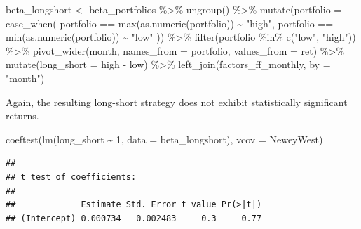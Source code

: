 \documentclass[
]{krantz}
\newenvironment{Shaded}{\begin{snugshade}}{\end{snugshade}}
\newcommand{\AttributeTok}[1]{\textcolor[rgb]{0.61,0.61,0.61}{#1}}
\newcommand{\DecValTok}[1]{\textcolor[rgb]{0.06,0.06,0.06}{#1}}
\newcommand{\FunctionTok}[1]{\textcolor[rgb]{0,0,0}{#1}}
\newcommand{\NormalTok}[1]{#1}
\newcommand{\OtherTok}[1]{\textcolor[rgb]{0.37,0.37,0.37}{#1}}
\newcommand{\SpecialCharTok}[1]{\textcolor[rgb]{0,0,0}{#1}}
\newcommand{\StringTok}[1]{\textcolor[rgb]{0.5,0.5,0.5}{#1}}
\begin{document}
\begin{Shaded}
\begin{Highlighting}[]
\NormalTok{beta\_longshort }\OtherTok{\textless{}{-}}\NormalTok{ beta\_portfolios }\SpecialCharTok{\%\textgreater{}\%}
  \FunctionTok{ungroup}\NormalTok{() }\SpecialCharTok{\%\textgreater{}\%}
  \FunctionTok{mutate}\NormalTok{(}\AttributeTok{portfolio =} \FunctionTok{case\_when}\NormalTok{(}
\NormalTok{    portfolio }\SpecialCharTok{==} \FunctionTok{max}\NormalTok{(}\FunctionTok{as.numeric}\NormalTok{(portfolio)) }\SpecialCharTok{\textasciitilde{}} \StringTok{"high"}\NormalTok{,}
\NormalTok{    portfolio }\SpecialCharTok{==} \FunctionTok{min}\NormalTok{(}\FunctionTok{as.numeric}\NormalTok{(portfolio)) }\SpecialCharTok{\textasciitilde{}} \StringTok{"low"}
\NormalTok{  )) }\SpecialCharTok{\%\textgreater{}\%}
  \FunctionTok{filter}\NormalTok{(portfolio }\SpecialCharTok{\%in\%} \FunctionTok{c}\NormalTok{(}\StringTok{"low"}\NormalTok{, }\StringTok{"high"}\NormalTok{)) }\SpecialCharTok{\%\textgreater{}\%}
  \FunctionTok{pivot\_wider}\NormalTok{(month, }\AttributeTok{names\_from =}\NormalTok{ portfolio, }\AttributeTok{values\_from =}\NormalTok{ ret) }\SpecialCharTok{\%\textgreater{}\%}
  \FunctionTok{mutate}\NormalTok{(}\AttributeTok{long\_short =}\NormalTok{ high }\SpecialCharTok{{-}}\NormalTok{ low) }\SpecialCharTok{\%\textgreater{}\%}
  \FunctionTok{left\_join}\NormalTok{(factors\_ff\_monthly, }\AttributeTok{by =} \StringTok{"month"}\NormalTok{)}
\end{Highlighting}
\end{Shaded}

Again, the resulting long-short strategy does not exhibit statistically significant returns.

\begin{Shaded}
\begin{Highlighting}[]
\FunctionTok{coeftest}\NormalTok{(}\FunctionTok{lm}\NormalTok{(long\_short }\SpecialCharTok{\textasciitilde{}} \DecValTok{1}\NormalTok{, }\AttributeTok{data =}\NormalTok{ beta\_longshort), }\AttributeTok{vcov =}\NormalTok{ NeweyWest)}
\end{Highlighting}
\end{Shaded}

\begin{verbatim}
## 
## t test of coefficients:
## 
##             Estimate Std. Error t value Pr(>|t|)
## (Intercept) 0.000734   0.002483     0.3     0.77
\end{verbatim}
\end{document}
